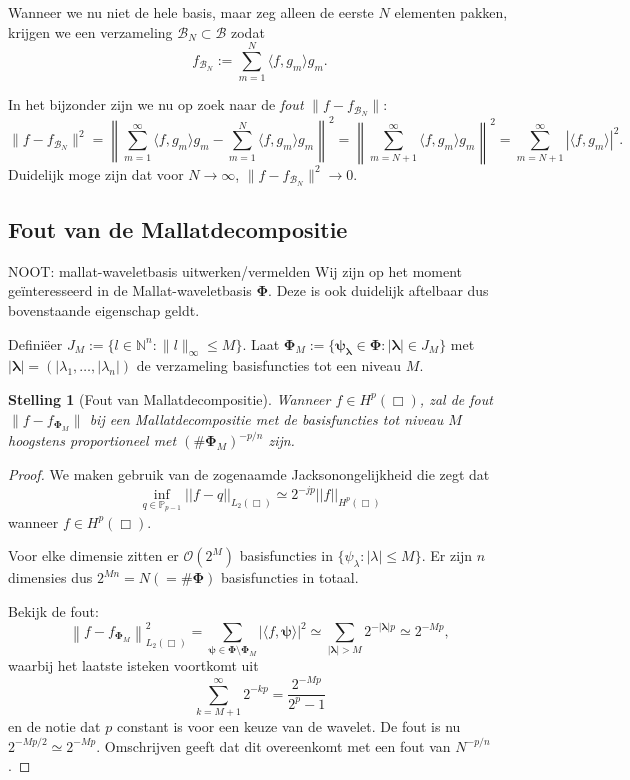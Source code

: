 \documentclass[11pt]{report}
\newcommand{\N}{\mathbb{N}}
\theoremstyle{plain}
\newtheorem*{stelling}{Stelling}
\theoremstyle{remark}
\begin{document}
Wanneer we nu niet de hele basis, maar zeg alleen de eerste $N$ elementen pakken, krijgen we een verzameling $\mathcal{B}_N \subset \mathcal{B}$ zodat
\[
	f_{\mathcal{B}_N} := \sum_{m = 1}^N \langle f, g_m \rangle g_m.
\]

In het bijzonder zijn we nu op zoek naar de \emph{fout} $\| f - f_{\mathcal{B}_N} \|$:
\[
	\| f - f_{\mathcal{B}_N} \|^2 = \left\| \sum_{m=1}^\infty\langle f, g_m \rangle g_m - \sum_{m=1}^N \langle f, g_m \rangle g_m \right\|^2 = \left\| \sum_{m=N+1}^\infty\langle f, g_m \rangle g_m \right\|^2 = \sum_{m=N+1}^\infty | \langle f, g_m \rangle |^2.
\]
Duidelijk moge zijn dat voor $N \to \infty$, $\| f - f_{\mathcal{B}_N} \|^2 \to 0$.

\subsection{Fout van de Mallatdecompositie}
NOOT: mallat-waveletbasis uitwerken/vermelden
Wij zijn op het moment ge\"interesseerd in de Mallat-waveletbasis $\boldsymbol\Phi$. Deze is ook duidelijk aftelbaar dus bovenstaande eigenschap geldt.

Defini\"eer $J_M := \{ l \in \N^n: \| l \|_\infty \leq M \}$. Laat $\boldsymbol\Phi_M := \{ \boldsymbol{\psi}_{\boldsymbol{\lambda}} \in \boldsymbol\Phi: |\boldsymbol\lambda| \in J_M \}$ met $|\boldsymbol\lambda| = (|\lambda_1, \ldots, |\lambda_n|)$ de verzameling basisfuncties tot een niveau $M$.

\begin{stelling}[Fout van Mallatdecompositie]
Wanneer $f \in H^p(\Box)$, zal de fout $\| f - f_{\mathcal{\boldsymbol\Phi}_M} \|$ bij een Mallatdecompositie met de basisfuncties tot niveau $M$ hoogstens proportioneel met $(\# \boldsymbol\Phi_M)^{-p/n}$ zijn.
\end{stelling}
\begin{proof}

We maken gebruik van de zogenaamde Jacksonongelijkheid \cite{jackson} die zegt dat 
\[
  \inf_{q \in \mathbb{P}_{p-1}} ||f - q||_{L_2(\Box)} \simeq 2^{-jp} ||f||_{H^p(\Box)}
\]
wanneer $f \in H^p(\Box)$.

Voor elke dimensie zitten er $\mathcal{O}(2^M)$ basisfuncties in $\{ \psi_\lambda: |\lambda| \leq M \}$. Er zijn $n$ dimensies dus $2^{Mn} = N (= \# \boldsymbol\Phi)$ basisfuncties in totaal.

Bekijk de fout:
\[
  \left\| f - f_{\boldsymbol\Phi_M} \right\|^2_{L_2(\Box)} = \sum_{{\boldsymbol\psi} \in \boldsymbol\Phi \setminus \boldsymbol\Phi_M} | \langle f, \boldsymbol\psi \rangle |^2 \simeq \sum_{|\boldsymbol\lambda| > M} 2^{-|\boldsymbol\lambda|p} \simeq 2^{-Mp},
\]
waarbij het laatste isteken voortkomt uit
\[
	\sum_{k=M+1}^\infty 2^{- kp} = \frac{2^{-Mp}}{2^p-1}
\]
en de notie dat $p$ constant is voor een keuze van de wavelet. De fout is nu $2^{-Mp/2} \simeq 2^{-Mp}$. Omschrijven geeft dat dit overeenkomt met een fout van $N^{-p/n}$.
\end{proof}
\end{document}
